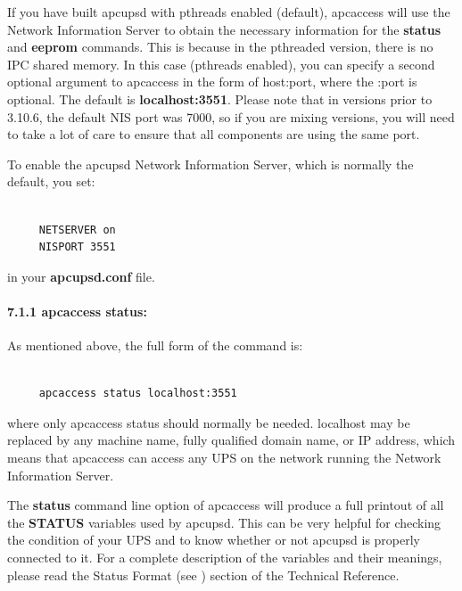 {{{{If you have built apcupsd with pthreads enabled (default), apcaccess will use
the Network Information Server to obtain the necessary information for the
{\bf status} and {\bf eeprom} commands. This is because in the pthreaded
version, there is no IPC shared memory. In this case (pthreads enabled), you
can specify a second optional argument to apcaccess in the form of host:port,
where the :port is optional. The default is {\bf localhost:3551}. Please note
that in versions prior to 3.10.6, the default NIS port was 7000, so if you are
mixing versions, you will need to take a lot of care to ensure that all
components are using the same port.  

To enable the apcupsd Network Information Server, which is normally the
default, you set: 

\footnotesize
\begin{verbatim}
     
     NETSERVER on
     NISPORT 3551
\end{verbatim}
\normalsize

in your {\bf apcupsd.conf} file. 

\label{apcaccess-status}

\paragraph*{7.1.1 apcaccess status:}

\label{index-apcaccess-status-112}
\label{index-status_002c-apcaccess-113}
As mentioned above, the full form of the command is: 

\footnotesize
\begin{verbatim}
     
     apcaccess status localhost:3551
\end{verbatim}
\normalsize

where only apcaccess status should normally be needed. localhost may be
replaced by any machine name, fully qualified domain name, or IP address,
which means that apcaccess can access any UPS on the network running the
Network Information Server.  

The {\bf status} command line option of apcaccess will produce a full printout
of all the {\bf STATUS} variables used by apcupsd. This can be very helpful
for checking the condition of your UPS and to know whether or not apcupsd is
properly connected to it. For a complete description of the variables and
their meanings, please read the Status Format (see 
) section of
the Technical Reference.  

}}}}
